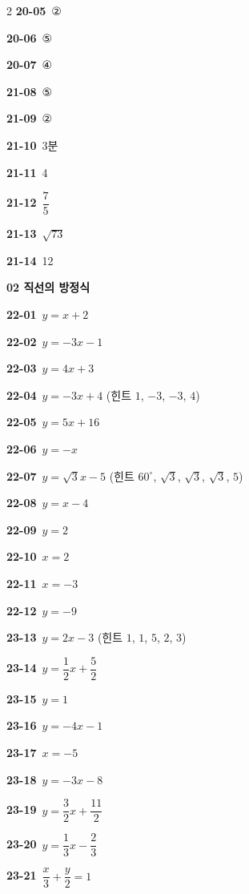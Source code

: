 \documentclass[10pt,a4paper]{article}
\begin{document}
\begin{multicols}{2}
\noindent\textbf{20-05}\ ②\par
\noindent\textbf{20-06}\ ⑤\par
\noindent\textbf{20-07}\ ④\par
\noindent\textbf{21-08}\ ⑤\par
\noindent\textbf{21-09}\ ②\par
\noindent\textbf{21-10}\ 3분\par
\noindent\textbf{21-11}\ 4\par
\noindent\textbf{21-12}\ $\dfrac{7}{5}$\par
\noindent\textbf{21-13}\ $\sqrt{73}$\par
\noindent\textbf{21-14}\ 12\par
\noindent\textbf{02 직선의 방정식}\par\smallskip
\noindent\textbf{22-01}\ $y=x+2$\par
\noindent\textbf{22-02}\ $y=-3x-1$\par
\noindent\textbf{22-03}\ $y=4x+3$\par
\noindent\textbf{22-04}\ $y=-3x+4$ (힌트 $1$, $-3$, $-3$, $4$)\par
\noindent\textbf{22-05}\ $y=5x+16$\par
\noindent\textbf{22-06}\ $y=-x$\par
\noindent\textbf{22-07}\ $y=\sqrt{3}x-5$ (힌트 $60^\circ$, $\sqrt{3}$, $\sqrt{3}$, $\sqrt{3}$, $5$)\par
\noindent\textbf{22-08}\ $y=x-4$\par
\noindent\textbf{22-09}\ $y=2$\par
\noindent\textbf{22-10}\ $x=2$\par
\noindent\textbf{22-11}\ $x=-3$\par
\noindent\textbf{22-12}\ $y=-9$\par
\noindent\textbf{23-13}\ $y=2x-3$ (힌트 $1$, $1$, $5$, $2$, $3$)\par
\noindent\textbf{23-14}\ $y=\dfrac{1}{2}x+\dfrac{5}{2}$\par
\noindent\textbf{23-15}\ $y=1$\par
\noindent\textbf{23-16}\ $y=-4x-1$\par
\noindent\textbf{23-17}\ $x=-5$\par
\noindent\textbf{23-18}\ $y=-3x-8$\par
\noindent\textbf{23-19}\ $y=\dfrac{3}{2}x+\dfrac{11}{2}$\par
\noindent\textbf{23-20}\ $y=\dfrac{1}{3}x-\dfrac{2}{3}$\par
\noindent\textbf{23-21}\ $\dfrac{x}{3}+\dfrac{y}{2}=1$\par

\end{multicols}
\end{document}
